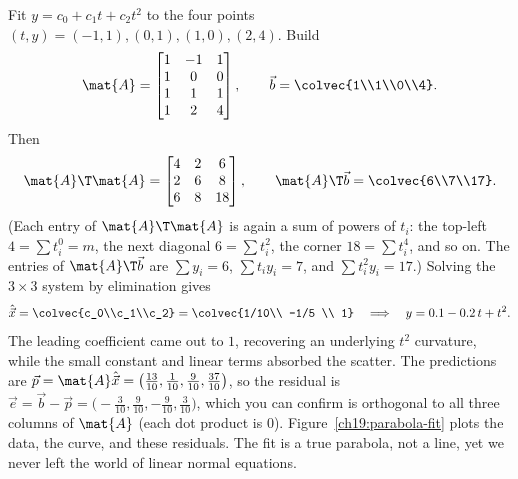 \begin{example}\label{ch19:parabola}
Fit $y=c_0+c_1t+c_2t^2$ to the four points $(t,y)=(-1,1),(0,1),(1,0),(2,4)$. Build
\[
  \mat{A}=\begin{bmatrix} 1&-1&1\\ 1&0&0\\ 1&1&1\\ 1&2&4\end{bmatrix},
  \qquad
  \vec{b}=\colvec{1\\1\\0\\4}.
\]
Then
\[
  \mat{A}\T\mat{A}
  =\begin{bmatrix} 4 & 2 & 6\\ 2 & 6 & 8\\ 6 & 8 & 18\end{bmatrix},
  \qquad
  \mat{A}\T\vec{b}=\colvec{6\\7\\17}.
\]
(Each entry of $\mat{A}\T\mat{A}$ is again a sum of powers of $t_i$: the top-left $4=\sum t_i^0=m$,
the next diagonal $6=\sum t_i^2$, the corner $18=\sum t_i^4$, and so on. The entries of
$\mat{A}\T\vec{b}$ are $\sum y_i=6$, $\sum t_i y_i=7$, and $\sum t_i^2 y_i=17$.) Solving the
$3\times3$ system by elimination gives
\[
  \hat{\vec{x}}=\colvec{c_0\\c_1\\c_2}=\colvec{1/10\\ -1/5 \\ 1}
  \quad\Longrightarrow\quad
  y = 0.1 - 0.2\,t + t^2 .
\]
The leading coefficient came out to $1$, recovering an underlying $t^2$ curvature, while the small
constant and linear terms absorbed the scatter. The predictions are $\vec{p}=\mat{A}\hat{\vec{x}}
=\bigl(\tfrac{13}{10},\tfrac{1}{10},\tfrac{9}{10},\tfrac{37}{10}\bigr)$, so the residual is
$\vec{e}=\vec{b}-\vec{p}=\bigl(-\tfrac{3}{10},\tfrac{9}{10},-\tfrac{9}{10},\tfrac{3}{10}\bigr)$,
which you can confirm is orthogonal to all three columns of $\mat{A}$ (each dot product is $0$).
Figure~\ref{ch19:parabola-fit} plots the data, the curve, and these residuals.
The fit is a true parabola, not a line, yet we never left the world of linear normal equations.
\end{example}

